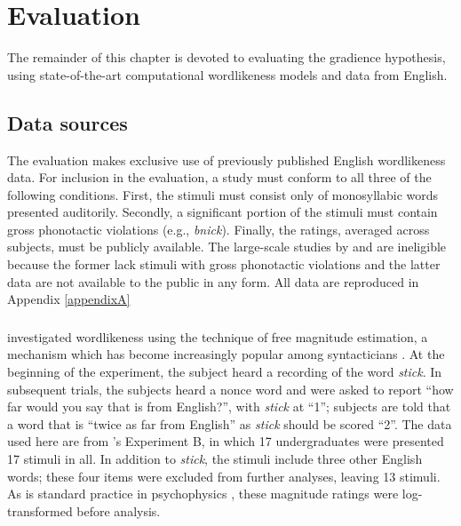 \section{Evaluation} \label{2evaluation}

The remainder of this chapter is devoted to evaluating the gradience hypothesis, using state-of-the-art computational wordlikeness models and data from English.

\subsection{Data sources}

The evaluation makes exclusive use of previously published English wordlikeness data. For inclusion in the evaluation, a study must conform to all three of the following conditions. First, the stimuli must consist only of monosyllabic words presented auditorily. Secondly, a significant portion of the stimuli must contain gross phonotactic violations (e.g., \emph{bnick}). Finally, the ratings, averaged across subjects, must be publicly available. The large-scale studies by \citet{Bailey2001} and \citet{Shademan2006,Shademan2007} are ineligible because the former lack stimuli with gross phonotactic violations and the latter data are not available to the public in any form. All data are reproduced in Appendix \ref{appendixA}

\subsubsection{\citealt{Greenberg1964}}

\citet{Greenberg1964} investigated wordlikeness using the technique of free magnitude estimation, a mechanism which has become increasingly popular among syntacticians \citep[e.g.,][]{Bard1996}. At the beginning of the experiment, the subject heard a recording of the word \emph{stick}. In subsequent trials, the subjects heard a nonce word and were asked to report ``how far would you say that is from English?'', with \emph{stick} at ``1''; subjects are told that a word that is ``twice as far from English'' as \emph{stick} should be scored ``2''. The data used here are from \citeauthor{Greenberg1964}'s Experiment B, in which 17 undergraduates were presented 17 stimuli in all. In addition to \emph{stick}, the stimuli include three other English words; these four items were excluded from further analyses, leaving 13 stimuli. As is standard practice in psychophysics \citep[e.g.,][]{Butler1987}, these magnitude ratings were log-transformed before analysis.

